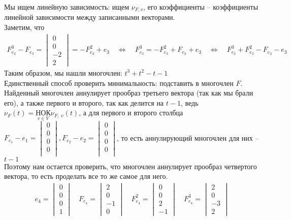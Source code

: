 		Мы ищем линейную зависимость: ищем $\nu_{F, v}$, его коэффициенты -- коэффициенты линейной зависимости между записанными векторами.\\
		Заметим, что 
		\begin{gather*}
			F^{3}_{e_{3}} - F_{e_{3}} = 
			\begin{vmatrix} 
				0\\ 0\\ -2\\ 2
			\end{vmatrix}
			= -F^{2}_{e_{3}} + e_{3} \quad \Leftrightarrow \quad 
			F^{3}_{e_{3}} = -F^{2}_{e_{3}} + F_{e_{3}} + e_{3} \quad \Leftrightarrow \quad 
			F^{3}_{e_{3}} + F^{2}_{e_{3}} - F_{e_{3}} - e_{3}
		\end{gather*}	
		Таким образом, мы нашли многочлен: $t^{3} + t^{2} - t - 1$\\
		Единственный способ проверить минимальность: подставить в многочлен $F$. Найденный многочлен аннулирует прообраз третьего вектора (так как мы брали его), а также первого и второго, так как делится на $t - 1$, ведь $\nu_{F}(t) = \underset{v \in V}{\text{НОК}} \nu_{F, \; v}(t)$, а для первого и второго столбца $F_{e_{1}} - e_{1} = \begin{vmatrix} 0\\ 0\\ 0\\ 0\\ \end{vmatrix}, F_{e_{2}} - e_{2} = \begin{vmatrix} 0\\ 0\\ 0\\ 0\\ \end{vmatrix}$, то есть аннулирующий многочлен для них -- $t - 1$\\
		Поэтому нам остается проверить, что многочлен аннулирует прообраз четвертого вектора, то есть проделать все то же самое для него. 
		\begin{gather*}
			e_{4} = 
			\begin{vmatrix}
				0\\ 0\\ 0\\ 1
			\end{vmatrix}
		\quad
			F_{e_{4}} =
			\begin{vmatrix}
				2\\ 0\\ -1\\ 0
			\end{vmatrix}
		\quad
			F^{2}_{e_{4}} = 
			\begin{vmatrix} 
				0\\ 0\\ 2\\ -1
			\end{vmatrix}
		\quad
			F^{3}_{e_{4}} = 
			\begin{vmatrix}
				2\\ 0\\ -3\\ 2
			\end{vmatrix}
		\end{gather*}
		
